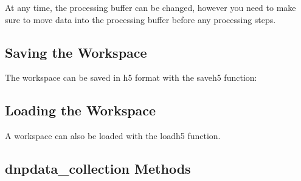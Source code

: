 \documentclass[letterpaper,10pt,english]{sphinxmanual}
\begin{document}
At any time, the processing buffer can be changed, however you need to make sure to move data into the processing buffer before any processing steps.

\begin{sphinxVerbatim}[commandchars=\\\{\}]
  
\end{sphinxVerbatim}


\subsection{Saving the Workspace}
\label{\detokenize{dnpData:saving-the-workspace}}
The workspace can be saved in h5 format with the saveh5 function:

\begin{sphinxVerbatim}[commandchars=\\\{\}]
 
\end{sphinxVerbatim}


\subsection{Loading the Workspace}
\label{\detokenize{dnpData:loading-the-workspace}}
A workspace can also be loaded with the loadh5 function.

\begin{sphinxVerbatim}[commandchars=\\\{\}]
\end{sphinxVerbatim}


\subsection{dnpdata\_collection Methods}
\label{\detokenize{dnpData:dnpdata-collection-methods}}
\end{document}
